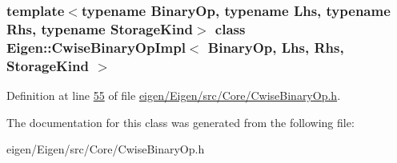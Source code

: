 \subsubsection*{template$<$typename Binary\+Op, typename Lhs, typename Rhs, typename Storage\+Kind$>$\newline
class Eigen\+::\+Cwise\+Binary\+Op\+Impl$<$ Binary\+Op, Lhs, Rhs, Storage\+Kind $>$}



Definition at line \hyperlink{eigen_2_eigen_2src_2_core_2_cwise_binary_op_8h_source_l00055}{55} of file \hyperlink{eigen_2_eigen_2src_2_core_2_cwise_binary_op_8h_source}{eigen/\+Eigen/src/\+Core/\+Cwise\+Binary\+Op.\+h}.



The documentation for this class was generated from the following file\+:\begin{DoxyCompactItemize}
\item 
eigen/\+Eigen/src/\+Core/\+Cwise\+Binary\+Op.\+h\end{DoxyCompactItemize}
